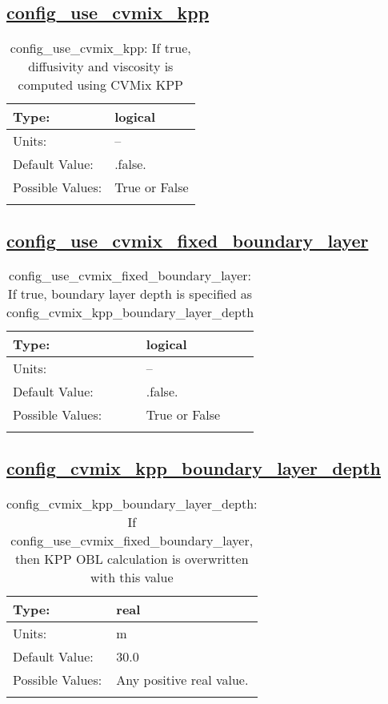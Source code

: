 \subsection[config\_use\_cvmix\_kpp]{\hyperref[sec:nm_tab_cvmix]{config\_use\_cvmix\_kpp}}
\label{subsec:nm_sec_config_use_cvmix_kpp}
\begin{center}
\begin{longtable}{| p{2.0in} || p{4.0in} |}
    \hline
    Type: & logical \\
    \hline
    Units: & -- \\
    \hline
    Default Value: & .false. \\
    \hline
    Possible Values: & True or False \\
    \hline
    \caption{config\_use\_cvmix\_kpp: If true, diffusivity and viscosity is computed using CVMix KPP}
\end{longtable}
\end{center}
\subsection[config\_use\_cvmix\_fixed\_boundary\_layer]{\hyperref[sec:nm_tab_cvmix]{config\_use\_cvmix\_fixed\_boundary\_layer}}
\label{subsec:nm_sec_config_use_cvmix_fixed_boundary_layer}
\begin{center}
\begin{longtable}{| p{2.0in} || p{4.0in} |}
    \hline
    Type: & logical \\
    \hline
    Units: & -- \\
    \hline
    Default Value: & .false. \\
    \hline
    Possible Values: & True or False \\
    \hline
    \caption{config\_use\_cvmix\_fixed\_boundary\_layer: If true, boundary layer depth is specified as config\_cvmix\_kpp\_boundary\_layer\_depth}
\end{longtable}
\end{center}
\subsection[config\_cvmix\_kpp\_boundary\_layer\_depth]{\hyperref[sec:nm_tab_cvmix]{config\_cvmix\_kpp\_boundary\_layer\_depth}}
\label{subsec:nm_sec_config_cvmix_kpp_boundary_layer_depth}
\begin{center}
\begin{longtable}{| p{2.0in} || p{4.0in} |}
    \hline
    Type: & real \\
    \hline
    Units: & \si{m} \\
    \hline
    Default Value: & 30.0 \\
    \hline
    Possible Values: & Any positive real value. \\
    \hline
    \caption{config\_cvmix\_kpp\_boundary\_layer\_depth: If config\_use\_cvmix\_fixed\_boundary\_layer, then KPP OBL calculation is overwritten with this value}
\end{longtable}
\end{center}
